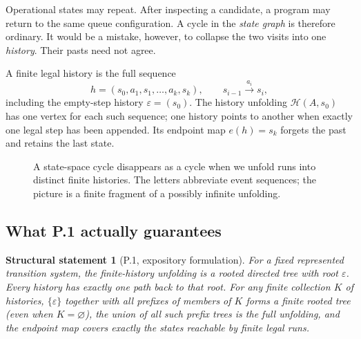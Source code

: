 \documentclass[11pt,letterpaper]{article}
\theoremstyle{plaincompact}
\newtheorem*{theorem}{Structural statement}
\newcommand{\hist}{\mathcal H}
\begin{document}
Operational states may repeat. After inspecting a candidate, a program may return to the same queue configuration. A cycle in the \emph{state graph} is therefore ordinary. It would be a mistake, however, to collapse the two visits into one \emph{history}. Their pasts need not agree.

A finite legal history is the full sequence
\[
 h=(s_0,a_1,s_1,\dots,a_k,s_k),\qquad
 s_{i-1}\xrightarrow{a_i}s_i,
\]
including the empty-step history $\varepsilon=(s_0)$. The history unfolding $\hist(A,s_0)$ has one vertex for each such sequence; one history points to another when exactly one legal step has been appended. Its endpoint map $e(h)=s_k$ forgets the past and retains the last state.

\begin{figure}[htbp]
\centering
{}
\caption{A state-space cycle disappears as a cycle when we unfold runs into distinct finite histories. The letters abbreviate event sequences; the picture is a finite fragment of a possibly infinite unfolding.}
\end{figure}

\subsection{What P.1 actually guarantees}
\begin{theorem}[P.1, expository formulation]
For a fixed represented transition system, the finite-history unfolding is a rooted directed tree with root $\varepsilon$. Every history has exactly one path back to that root. For any finite collection $K$ of histories, $\{\varepsilon\}$ together with all prefixes of members of $K$ forms a finite rooted tree (even when $K=\varnothing$), the union of all such prefix trees is the full unfolding, and the endpoint map covers exactly the states reachable by finite legal runs.
\end{theorem}
\end{document}
